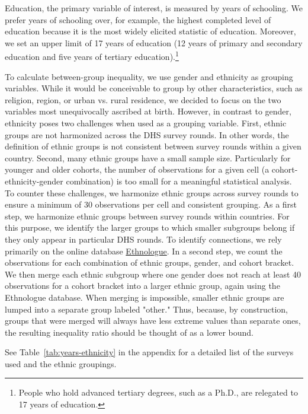 Education, the primary variable of interest, is measured by years of schooling. We prefer years of schooling over, for example, the highest completed level of education because it is the most widely elicited statistic of education. Moreover, we set an upper limit of 17 years of education (12 years of primary and secondary education and five years of tertiary education).\footnote{People who hold advanced tertiary degrees, such as a Ph.D., are relegated to 17 years of education.} 

To calculate between-group inequality, we use gender and ethnicity as grouping variables. While it would be conceivable to group by other characteristics, such as religion, region, or urban vs. rural residence, we decided to focus on the two variables most unequivocally ascribed at birth. However, in contrast to gender, ethnicity poses two challenges when used as a grouping variable. First, ethnic groups are not harmonized across the DHS survey rounds. In other words, the definition of ethnic groups is not consistent between survey rounds within a given country. Second, many ethnic groups have a small sample size. Particularly for younger and older cohorts, the number of observations for a given cell (a cohort-ethnicity-gender combination) is too small for a meaningful statistical analysis. To counter these challenges, we harmonize ethnic groups across survey rounds to ensure a minimum of 30 observations per cell and consistent grouping. As a first step, we harmonize ethnic groups between survey rounds within countries. For this purpose, we identify the larger groups to which smaller subgroups belong if they only appear in particular DHS rounds. To identify connections, we rely primarily on the online database \href{https://www.ethnologue.com/}{Ethnologue}. In a second step, we count the observations for each combination of ethnic groups, gender, and cohort bracket. We then merge each ethnic subgroup where one gender does not reach at least 40 observations for a cohort bracket into a larger ethnic group, again using the Ethnologue database. When merging is impossible, smaller ethnic groups are lumped into a separate group labeled "other." Thus, because, by construction, groups that were merged will always have less extreme values than separate ones, the resulting inequality ratio should be thought of as a lower bound. 

See Table~\ref{tab:years-ethnicity} in the appendix for a detailed list of the surveys used and the ethnic groupings. %

